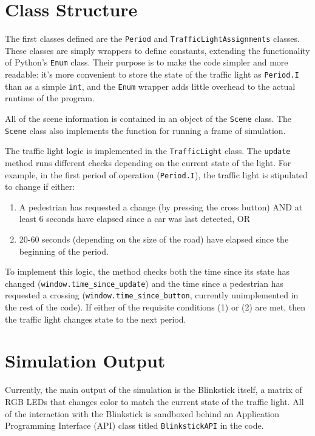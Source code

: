 \documentclass[
  letterpaper,
  DIV=11,
  numbers=noendperiod]{scrartcl}
\providecommand{\tightlist}{%
  \setlength{\itemsep}{0pt}\setlength{\parskip}{0pt}}\usepackage{longtable,booktabs,array}
\begin{document}
\hypertarget{class-structure}{%
\section{Class Structure}\label{class-structure}}

The first classes defined are the \texttt{Period} and
\texttt{TrafficLightAssignments} classes. These classes are simply
wrappers to define constants, extending the functionality of Python's
\texttt{Enum} class. Their purpose is to make the code simpler and more
readable: it's more convenient to store the state of the traffic light
as \texttt{Period.I} than as a simple \texttt{int}, and the
\texttt{Enum} wrapper adds little overhead to the actual runtime of the
program.

All of the scene information is contained in an object of the
\texttt{Scene} class. The \texttt{Scene} class also implements the
function for running a frame of simulation.

The traffic light logic is implemented in the \texttt{TrafficLight}
class. The \texttt{update} method runs different checks depending on the
current state of the light. For example, in the first period of
operation (\texttt{Period.I}), the traffic light is stipulated to change
if either:

\begin{enumerate}
\def\labelenumi{\arabic{enumi}.}
\tightlist
\item
  A pedestrian has requested a change (by pressing the cross button) AND
  at least 6 seconds have elapsed since a car was last detected, OR
\item
  20-60 seconds (depending on the size of the road) have elapsed since
  the beginning of the period.
\end{enumerate}

To implement this logic, the method checks both the time since its state
has changed (\texttt{window.time\_since\_update}) and the time since a
pedestrian has requested a crossing
(\texttt{window.time\_since\_button}, currently unimplemented in the
rest of the code). If either of the requisite conditions (1) or (2) are
met, then the traffic light changes state to the next period.

\hypertarget{simulation-output}{%
\section{Simulation Output}\label{simulation-output}}

Currently, the main output of the simulation is the Blinkstick itself, a
matrix of RGB LEDs that changes color to match the current state of the
traffic light. All of the interaction with the Blinkstick is sandboxed
behind an Application Programming Interface (API) class titled
\texttt{BlinkstickAPI} in the code.
\end{document}
